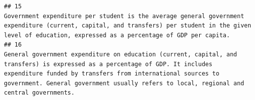 \documentclass[
]{article}
\begin{document}
\begin{verbatim}
## 15                                                                                                                                                                                                                                                                                                                                                                                                                                                                                                                                                                                                                                                                                                                                                                                                                                                                                                                                                                                                                                                                                                                                                                                                                                      Government expenditure per student is the average general government expenditure (current, capital, and transfers) per student in the given level of education, expressed as a percentage of GDP per capita.
## 16                                                                                                                                                                                                                                                                                                                                                                                                                                                                                                                                                                                                                                                                                                                                                                                                                                                                                                                                                                                                                                                                                                                                                            General government expenditure on education (current, capital, and transfers) is expressed as a percentage of GDP. It includes expenditure funded by transfers from international sources to government. General government usually refers to local, regional and central governments.

\end{verbatim}
\end{document}
